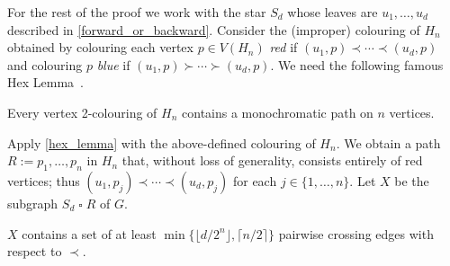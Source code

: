 \documentclass[kpfonts]{patmorin}
\newcommand{\CartProd}{\mathbin{\square}}
\begin{document}
For the rest of the proof we work with the star $S_d$ whose leaves are $u_1,\ldots,u_d$ described in \cref{forward_or_backward}.  Consider the (improper) colouring of $H_n$ obtained by colouring each vertex $p\in V(H_n)$ \emph{red} if $(u_1,p)\prec\cdots\prec (u_d,p)$ and colouring $p$ \emph{blue} if $(u_1,p)\succ\cdots\succ(u_d,p)$. We need the following famous Hex Lemma~\citep{Gale79}.

\begin{lem} \label{hex_lemma}
Every vertex 2-colouring of $H_n$ contains a monochromatic path on $n$ vertices.
\end{lem}


Apply \cref{hex_lemma} with the above-defined colouring of $H_n$. We obtain a path $R:=p_1,\ldots,p_n$ in $H_n$ that, without loss of generality, consists entirely of red vertices;
thus $(u_1,p_j)\prec\cdots\prec (u_d,p_j)$ for each $j\in\{1,\ldots,n\}$.  Let $X$ be the subgraph $S_d \CartProd R$ of $G$.

\begin{lem}\label{twister}
$X$ contains a set of at least $\min\{\lfloor d/2^{n}\rfloor,\lceil n/2\rceil\}$ pairwise crossing edges with respect to $\prec$.
\end{lem}
\end{document}
